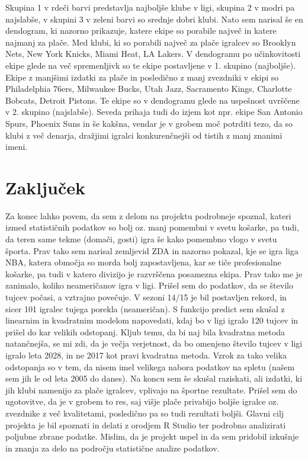 \documentclass[11pt,a4paper]{article}
\begin{document}

\newpage
Skupina 1 v rdeči barvi predstavlja najboljše klube v ligi, skupina 2 v modri pa najslabše, v skupini 3 v zeleni barvi so srednje dobri klubi.
Nato sem narisal še en dendogram, ki nazorno prikazuje, katere ekipe so porabile največ in katere najmanj za plače. Med klubi, ki so porabili največ za plače igralcev so Brooklyn Nets, New York Knicks, Miami Heat, LA Lakers. V dendogramu po učinkovitosti ekipe glede na več spremenljivk so te ekipe postavljene v 1. skupino (najboljše). Ekipe z manjšimi izdatki za plače in posledično z manj zvezdniki v ekipi so Philadelphia 76ers, Milwaukee Bucks, Utah Jazz, Sacramento Kings, Charlotte Bobcats, Detroit Pistons. Te ekipe so v dendogramu glede na uspešnost uvrščene v 2. skupino (najslabše). Seveda prihaja tudi do izjem kot npr. ekipe San Antonio Spurs, Phoenix Suns in še kakšna, vendar je v grobem moč potrditi tezo, da so klubi z več denarja, dražjimi igralci konkurenčnejši od tistih z manj znanimi imeni.\\

\newpage
\section{Zaključek}
Za konec lahko povem, da sem z delom na projektu podrobneje spoznal, kateri izmed statističnih podatkov so bolj oz. manj pomembni v svetu košarke, pa tudi, da teren same tekme (domači, gosti) igra še kako pomembno vlogo v svetu športa. Prav tako sem narisal zemljevid ZDA in nazorno pokazal, kje se igra liga NBA, katera območja so morda bolj zapostavljena, kar se tiče profesionalne košarke, pa tudi v katero divizijo je razvrščena posamezna ekipa. Prav tako me je zanimalo, koliko neameričanov igra v ligi. Prišel sem do podatkov, da se število tujcev počasi, a vztrajno povečuje. V sezoni 14/15 je bil postavljen rekord, in sicer 101 igralec tujega porekla (neameričan). S funkcijo predict sem skušal z linearnim in kvadratnim modelom napovedati, kdaj bo v ligi igralo 120 tujcev in prišel do kar velikih odstopanj. Kljub temu, da bi naj bila kvadratna metoda natančnejša, se mi zdi, da je večja verjetnost, da bo omenjeno število tujcev v ligi igralo leta 2028, in ne 2017 kot pravi kvadratna metoda. Vzrok za tako velika odstopanja so v tem, da nisem imel velikega nabora podatkov na spletu (našem sem jih le od leta 2005 do danes). Na koncu sem še skušal raziskati, ali izdatki, ki jih klubi namenijo za plače igralcev, vplivajo na športne rezultate. Prišel sem do ugotovitve, da je v grobem to res, saj višje plače privabijo boljše igralce oz. zvezdnike z več kvalitetami, posledično pa so tudi rezultati boljši. Glavni cilj projekta je bil spoznati in delati z orodjem R Studio ter podrobno analizirati poljubne zbrane podatke. Mislim, da je projekt uspel in da sem pridobil izkušnje in znanja za delo na področju statistične analize podatkov.
\end{document}
